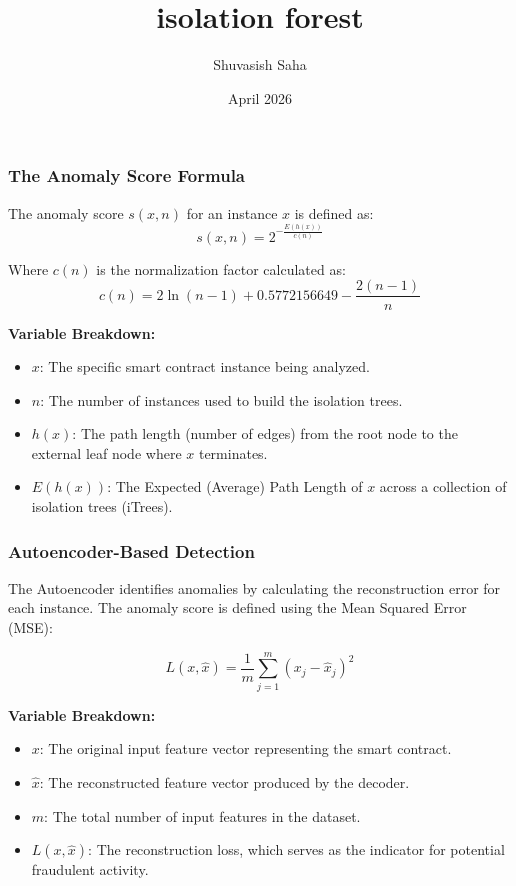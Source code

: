 \documentclass{article}
\title{isolation forest}
\author{Shuvasish Saha}
\date{April 2026}
\begin{document}
\maketitle
\subsubsection{The Anomaly Score Formula}
The anomaly score $s(x, n)$ for an instance $x$ is defined as:
\begin{equation}
    s(x, n) = 2^{-\frac{E(h(x))}{c(n)}}
\end{equation}

Where $c(n)$ is the normalization factor calculated as:
\begin{equation}
    c(n) = 2 \ln(n - 1) + 0.5772156649 - \frac{2(n - 1)}{n}
\end{equation}

\textbf{Variable Breakdown:}
\begin{itemize}
    \item \textbf{$x$}: The specific smart contract instance being analyzed.
    \item \textbf{$n$}: The number of instances used to build the isolation trees.
    \item \textbf{$h(x)$}: The path length (number of edges) from the root node to the external leaf node where $x$ terminates.
    \item \textbf{$E(h(x))$}: The Expected (Average) Path Length of $x$ across a collection of isolation trees (iTrees).
\end{itemize}
\subsubsection{Autoencoder-Based Detection}
The Autoencoder identifies anomalies by calculating the reconstruction error for each instance. The anomaly score is defined using the Mean Squared Error (MSE):

\begin{equation}
    L(x, \hat{x}) = \frac{1}{m} \sum_{j=1}^{m} (x_j - \hat{x}_j)^2
\end{equation}

\textbf{Variable Breakdown:}
\begin{itemize}
    \item \textbf{$x$}: The original input feature vector representing the smart contract.
    \item \textbf{$\hat{x}$}: The reconstructed feature vector produced by the decoder.
    \item \textbf{$m$}: The total number of input features in the dataset.
    \item \textbf{$L(x, \hat{x})$}: The reconstruction loss, which serves as the indicator for potential fraudulent activity.
\end{itemize}
\end{document}
